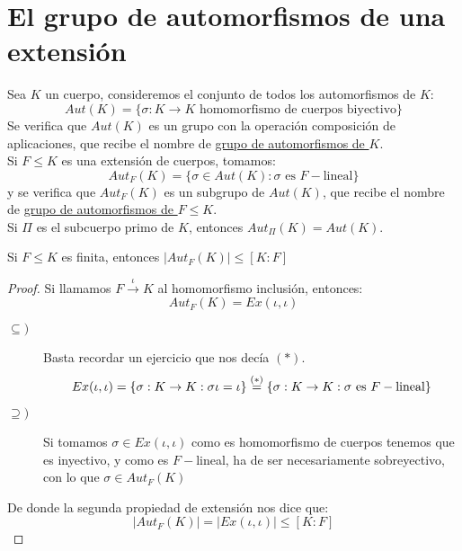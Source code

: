 \section{El grupo de automorfismos de una extensión}
\begin{definicion}
    Sea $K$ un cuerpo, consideremos el conjunto de todos los automorfismos de $K$:
    \begin{equation*}
        Aut(K) = \{\sigma:K\to K \text{\ homomorfismo de cuerpos biyectivo}\}
    \end{equation*}
    Se verifica que $Aut(K)$ es un grupo con la operación composición de aplicaciones, que recibe el nombre de \underline{grupo de automorfismos de $K$}. \\

    \noindent
    Si $F\leq K$ es una extensión de cuerpos, tomamos:
    \begin{equation*}
        Aut_F(K) = \{\sigma\in Aut(K) : \sigma \text{\ es\ } F-\text{lineal}\}
    \end{equation*}
    y se verifica que $Aut_F(K)$ es un subgrupo de $Aut(K)$, que recibe el nombre de \underline{grupo de automorfismos de $F\leq K$}.\\

    \noindent
    Si $\Pi$ es el subcuerpo primo de $K$, entonces $Aut_\Pi(K) = Aut(K)$.
\end{definicion}

\begin{prop}
    Si $F\leq K$ es finita, entonces $|Aut_F(K)| \leq [K:F]$
    \begin{proof}
        Si llamamos $F\stackrel{\iota}{\to}K$ al homomorfismo inclusión, entonces:
        \begin{equation*}
            Aut_F(K) = Ex(\iota, \iota)
        \end{equation*}
        \begin{description}
            \item [$\subseteq )$] Basta recordar un ejercicio que nos decía $(\ast)$.
                \begin{equation*}
                    Ex(\iota, \iota) = \{\sigma:K\to K : \sigma\iota = \iota\} \stackrel{(\ast)}{=} \{\sigma:K\to K : \sigma \text{\ es\ } F-\text{lineal}\}
                \end{equation*}
            \item [$\supseteq )$] Si tomamos $\sigma\in Ex(\iota,\iota)$ como es homomorfismo de cuerpos tenemos que es inyectivo, y como es $F-$lineal, ha de ser necesariamente sobreyectivo, con lo que $\sigma\in Aut_F(K)$
        \end{description}
        De donde la segunda propiedad de extensión nos dice que:
        \begin{equation*}
            |Aut_F(K)| = |Ex(\iota,\iota)| \leq [K:F]
        \end{equation*}
    \end{proof}
\end{prop}

